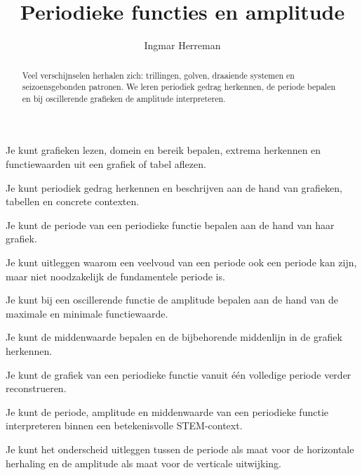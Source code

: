 \documentclass{ximera}
\title{Periodieke functies en amplitude}
\author{Ingmar Herreman}
\begin{document}





\begin{abstract}
Veel verschijnselen herhalen zich: trillingen, golven, draaiende systemen en
seizoensgebonden patronen. We leren periodiek gedrag herkennen, de periode
bepalen en bij oscillerende grafieken de amplitude interpreteren.
\end{abstract}

\maketitle

\begin{voorkennis}
\item Je kunt grafieken lezen, domein en bereik bepalen, extrema herkennen en
functiewaarden uit een grafiek of tabel aflezen.
\end{voorkennis}

\begin{leerdoelen}

    \item Je kunt periodiek gedrag herkennen en beschrijven aan de hand van grafieken, tabellen en concrete contexten.
  
    \item Je kunt de periode van een periodieke functie bepalen aan de hand van haar grafiek.
  
    \item Je kunt uitleggen waarom een veelvoud van een periode ook een periode kan zijn, maar niet noodzakelijk de fundamentele periode is.
  
    \item Je kunt bij een oscillerende functie de amplitude bepalen aan de hand van de maximale en minimale functiewaarde.
  
    \item Je kunt de middenwaarde bepalen en de bijbehorende middenlijn in de grafiek herkennen.
  
    \item Je kunt de grafiek van een periodieke functie vanuit één volledige periode verder reconstrueren.
  
    \item Je kunt de periode, amplitude en middenwaarde van een periodieke functie interpreteren binnen een betekenisvolle STEM-context.
  
    \item Je kunt het onderscheid uitleggen tussen de periode als maat voor de horizontale herhaling en de amplitude als maat voor de verticale uitwijking.
  
  \end{leerdoelen}
\end{document}
